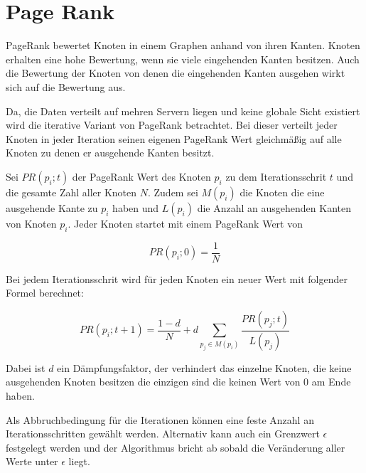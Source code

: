\section{Page Rank}

PageRank bewertet Knoten in einem Graphen anhand von ihren Kanten. Knoten erhalten eine hohe Bewertung, wenn sie viele eingehenden Kanten besitzen. Auch die Bewertung der Knoten von denen die eingehenden Kanten ausgehen wirkt sich auf die Bewertung aus.


Da, die Daten verteilt auf mehren Servern liegen und keine globale Sicht existiert wird die iterative Variant von PageRank betrachtet.
Bei dieser verteilt jeder Knoten in jeder Iteration seinen eigenen PageRank Wert gleichmäßig auf alle Knoten zu denen er ausgehende Kanten besitzt. 


Sei $ PR(p_{i}; t)$ der PageRank Wert des Knoten $p_{i}$ zu dem Iterationsschrit $t$ und die gesamte Zahl aller Knoten $N$.
Zudem sei $M(p_{i})$ die Knoten die eine ausgehende Kante zu $p_{i}$ haben und $L(p_{i})$ die Anzahl an ausgehenden Kanten von Knoten $p_{i}$.
Jeder Knoten startet mit einem PageRank Wert von

\[  PR(p_{i}; 0) = \frac{1}{N}   \]

Bei jedem Iterationsschrit wird für jeden Knoten ein neuer Wert mit folgender Formel berechnet:

\[ PR(p_{i}; t+1) = \frac{1 - d}{N} + d \sum_{p_{j} \in M(p_{i})} \frac{PR(p_{j}; t)}{L(p_{j})} \]


Dabei ist $d$ ein Dämpfungsfaktor, der verhindert das einzelne Knoten, die keine ausgehenden Knoten besitzen die einzigen sind die keinen Wert von 0 am Ende haben.

Als Abbruchbedingung für die Iterationen können eine feste Anzahl an Iterationsschritten gewählt werden. Alternativ kann auch ein Grenzwert $\epsilon$ festgelegt werden und der Algorithmus bricht ab sobald die Veränderung aller Werte unter $\epsilon$ liegt.
